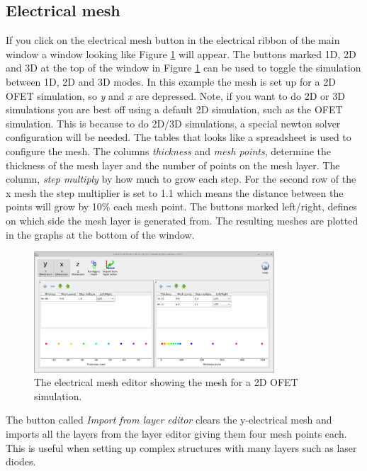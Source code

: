 \subsection{Electrical mesh}
If you click on the electrical mesh button in the electrical ribbon of the main window a window looking like Figure \ref{fig:emesh} will appear. The buttons marked 1D, 2D and 3D at the top of the window in Figure \ref{fig:emesh} can be used to toggle the simulation between 1D, 2D and 3D modes.  In this example the mesh is set up for a 2D OFET simulation, so \emph{y} and \emph{x} are depressed. Note, if you want to do 2D or 3D simulations you are best off using a default 2D simulation, such as the OFET simulation.  This is because to do 2D/3D simulations, a special newton solver configuration will be needed. The tables that looks like a spreadsheet is used to configure the mesh. The columns \emph{thickness} and \emph{mesh points}, determine the thickness of the mesh layer and the number of points on the mesh layer. The column, \emph{step multiply} by how much to grow each step.  For the second row of the x mesh the step multiplier is set to 1.1 which means the distance between the points will grow by 10\% each mesh point. The buttons marked left/right, defines on which side the mesh layer is generated from.  The resulting meshes are plotted in the graphs at the bottom of the window.

\begin{figure}[H]
\centering
\includegraphics[width=0.8\textwidth]{./images/mesh/electrical_mesh_window.png}
\caption{The electrical mesh editor showing the mesh for a 2D OFET simulation.}
\label{fig:emesh}
\end{figure}

The button called \emph{Import from layer editor} clears the y-electrical mesh and imports all the layers from the layer editor giving them four mesh points each. This is useful when setting up complex structures with many layers such as laser diodes.
 
